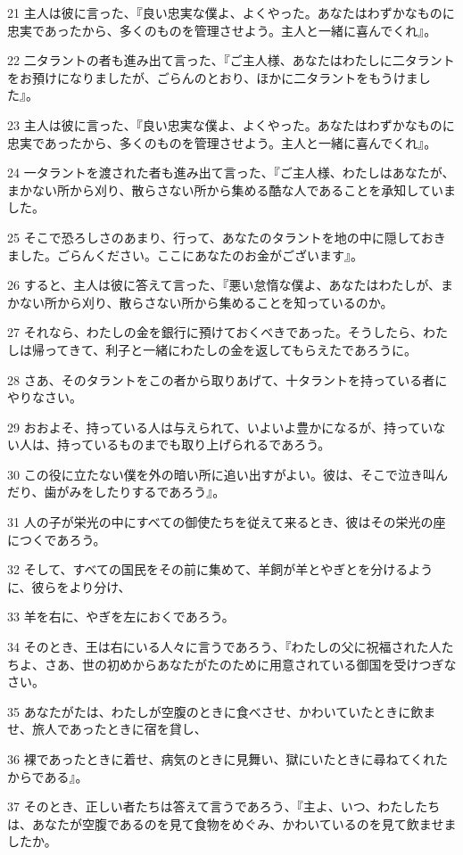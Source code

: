 \par 21 主人は彼に言った、『良い忠実な僕よ、よくやった。あなたはわずかなものに忠実であったから、多くのものを管理させよう。主人と一緒に喜んでくれ』。
\par 22 二タラントの者も進み出て言った、『ご主人様、あなたはわたしに二タラントをお預けになりましたが、ごらんのとおり、ほかに二タラントをもうけました』。
\par 23 主人は彼に言った、『良い忠実な僕よ、よくやった。あなたはわずかなものに忠実であったから、多くのものを管理させよう。主人と一緒に喜んでくれ』。
\par 24 一タラントを渡された者も進み出て言った、『ご主人様、わたしはあなたが、まかない所から刈り、散らさない所から集める酷な人であることを承知していました。
\par 25 そこで恐ろしさのあまり、行って、あなたのタラントを地の中に隠しておきました。ごらんください。ここにあなたのお金がございます』。
\par 26 すると、主人は彼に答えて言った、『悪い怠惰な僕よ、あなたはわたしが、まかない所から刈り、散らさない所から集めることを知っているのか。
\par 27 それなら、わたしの金を銀行に預けておくべきであった。そうしたら、わたしは帰ってきて、利子と一緒にわたしの金を返してもらえたであろうに。
\par 28 さあ、そのタラントをこの者から取りあげて、十タラントを持っている者にやりなさい。
\par 29 おおよそ、持っている人は与えられて、いよいよ豊かになるが、持っていない人は、持っているものまでも取り上げられるであろう。
\par 30 この役に立たない僕を外の暗い所に追い出すがよい。彼は、そこで泣き叫んだり、歯がみをしたりするであろう』。
\par 31 人の子が栄光の中にすべての御使たちを従えて来るとき、彼はその栄光の座につくであろう。
\par 32 そして、すべての国民をその前に集めて、羊飼が羊とやぎとを分けるように、彼らをより分け、
\par 33 羊を右に、やぎを左におくであろう。
\par 34 そのとき、王は右にいる人々に言うであろう、『わたしの父に祝福された人たちよ、さあ、世の初めからあなたがたのために用意されている御国を受けつぎなさい。
\par 35 あなたがたは、わたしが空腹のときに食べさせ、かわいていたときに飲ませ、旅人であったときに宿を貸し、
\par 36 裸であったときに着せ、病気のときに見舞い、獄にいたときに尋ねてくれたからである』。
\par 37 そのとき、正しい者たちは答えて言うであろう、『主よ、いつ、わたしたちは、あなたが空腹であるのを見て食物をめぐみ、かわいているのを見て飲ませましたか。
